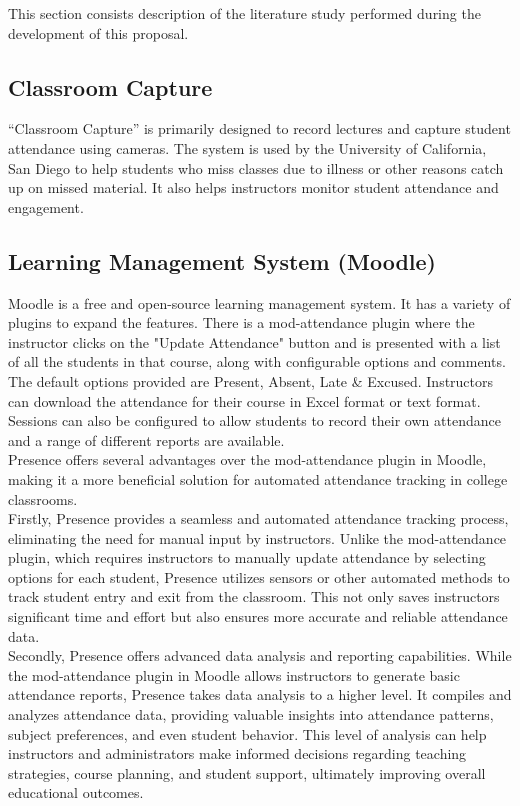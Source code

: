 This section consists description of the literature study performed during the development of this proposal.

\subsection{Classroom Capture}
“Classroom Capture”\cite{reading_attendance} is primarily designed to record lectures and capture student attendance using cameras. The system is used by the University of California, San Diego to help students who miss classes due to illness or other reasons catch up on missed material. It also helps instructors monitor student attendance and engagement.

\subsection{Learning Management System (Moodle)}

Moodle is a free and open-source learning management system. It has a variety of plugins to expand the features. There is a mod-attendance\cite{moodle_attendance} plugin where the instructor clicks on the "Update Attendance" button and is presented with a list of all the students in that course, along with configurable options and comments. The default options provided are Present, Absent, Late & Excused. Instructors can download the attendance for their course in Excel format or text format. Sessions can also be configured to allow students to record their own attendance and a range of different reports are available.\\

Presence offers several advantages over the mod-attendance plugin in Moodle, making it a more beneficial solution for automated attendance tracking in college classrooms.\\

Firstly, Presence provides a seamless and automated attendance tracking process, eliminating the need for manual input by instructors. Unlike the mod-attendance plugin, which requires instructors to manually update attendance by selecting options for each student, Presence utilizes sensors or other automated methods to track student entry and exit from the classroom. This not only saves instructors significant time and effort but also ensures more accurate and reliable attendance data.\\

Secondly, Presence offers advanced data analysis and reporting capabilities. While the mod-attendance plugin in Moodle allows instructors to generate basic attendance reports, Presence takes data analysis to a higher level. It compiles and analyzes attendance data, providing valuable insights into attendance patterns, subject preferences, and even student behavior. This level of analysis can help instructors and administrators make informed decisions regarding teaching strategies, course planning, and student support, ultimately improving overall educational outcomes.\\

